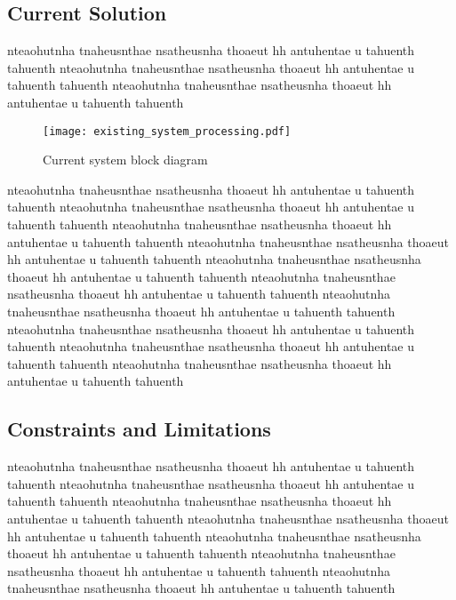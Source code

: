 \subsection{Current Solution}
nteaohutnha tnaheusnthae nsatheusnha thoaeut hh antuhentae u tahuenth tahuenth
nteaohutnha tnaheusnthae nsatheusnha thoaeut hh antuhentae u tahuenth tahuenth
nteaohutnha tnaheusnthae nsatheusnha thoaeut hh antuhentae u tahuenth tahuenth
\begin{figure}[!tbh]
    \centering
    \texttt{[image: existing\_system\_processing.pdf]}
    \caption{Current system block diagram}
    \label{fig:current_system_processing}
\end{figure}
nteaohutnha tnaheusnthae nsatheusnha thoaeut hh antuhentae u tahuenth tahuenth
nteaohutnha tnaheusnthae nsatheusnha thoaeut hh antuhentae u tahuenth tahuenth
nteaohutnha tnaheusnthae nsatheusnha thoaeut hh antuhentae u tahuenth tahuenth
nteaohutnha tnaheusnthae nsatheusnha thoaeut hh antuhentae u tahuenth tahuenth
nteaohutnha tnaheusnthae nsatheusnha thoaeut hh antuhentae u tahuenth tahuenth
nteaohutnha tnaheusnthae nsatheusnha thoaeut hh antuhentae u tahuenth tahuenth
nteaohutnha tnaheusnthae nsatheusnha thoaeut hh antuhentae u tahuenth tahuenth
nteaohutnha tnaheusnthae nsatheusnha thoaeut hh antuhentae u tahuenth tahuenth
nteaohutnha tnaheusnthae nsatheusnha thoaeut hh antuhentae u tahuenth tahuenth
nteaohutnha tnaheusnthae nsatheusnha thoaeut hh antuhentae u tahuenth tahuenth

\subsection{Constraints and Limitations}
nteaohutnha tnaheusnthae nsatheusnha thoaeut hh antuhentae u tahuenth tahuenth
nteaohutnha tnaheusnthae nsatheusnha thoaeut hh antuhentae u tahuenth tahuenth
nteaohutnha tnaheusnthae nsatheusnha thoaeut hh antuhentae u tahuenth tahuenth
nteaohutnha tnaheusnthae nsatheusnha thoaeut hh antuhentae u tahuenth tahuenth
nteaohutnha tnaheusnthae nsatheusnha thoaeut hh antuhentae u tahuenth tahuenth
nteaohutnha tnaheusnthae nsatheusnha thoaeut hh antuhentae u tahuenth tahuenth
nteaohutnha tnaheusnthae nsatheusnha thoaeut hh antuhentae u tahuenth tahuenth

